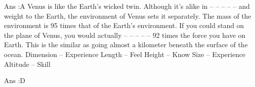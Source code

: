     Ans :A
    Venus is like the Earth’s wicked twin. Although it’s alike in -- -- -- -- -- and weight to the Earth, the environment of Venus sets it separately. The mass of the environment is 95 times that of the Earth’s environment. If you could stand on the plane of Venus, you would actually -- -- -- -- -- 92 times the force you have on Earth. This is the similar as going almost a kilometer beneath the surface of the ocean.
        Dimension – Experience
        Length – Feel
        Height – Know
        Size – Experience
        Altitude – Skill 

    Ans :D 


